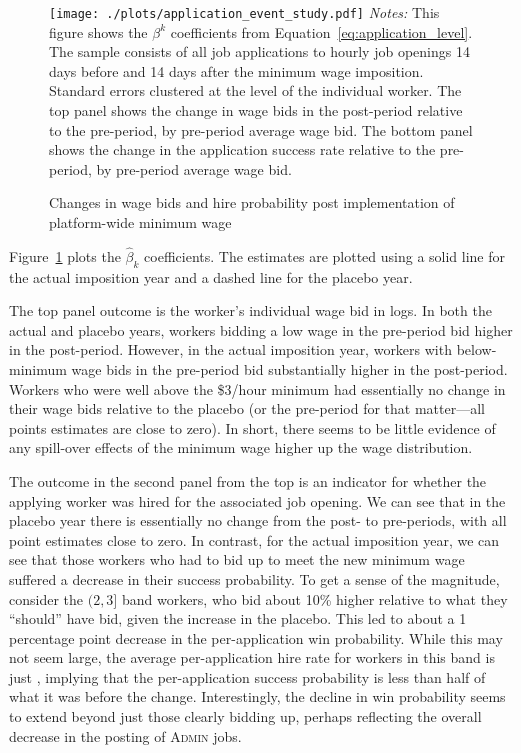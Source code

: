 \documentclass[AER]{AEA}
\newcommand{\admin}{\textsc{Admin}}
\begin{document}
\begin{figure}[ht!]
\centering 
\caption{Changes in wage bids and hire probability post implementation of platform-wide minimum wage} \label{fig:event_study} 
\begin{minipage}{0.95 \textwidth}
  \texttt{[image: ./plots/application\_event\_study.pdf]}
{\footnotesize
  \emph{Notes:} This figure shows the $\beta^k$ coefficients from Equation~\ref{eq:application_level}. 
   The sample consists of all job applications to hourly job openings 14 days before and 14 days after the minimum wage imposition.
   Standard errors clustered at the level of the individual worker. 
   The top panel shows the change in wage bids in the post-period relative to the pre-period, by pre-period average wage bid. 
   The bottom panel shows the change in the application success rate relative to the pre-period, by pre-period average wage bid.  
}
\end{minipage} 
\end{figure}

Figure~\ref{fig:event_study} plots the $\hat{\beta}_k$ coefficients.
The estimates are plotted using a solid line for the actual imposition year and a dashed line for the placebo year.

The top panel outcome is the worker's individual wage bid in logs.
In both the actual and placebo years, workers bidding a low wage in the pre-period bid higher in the post-period.
However, in the actual imposition year, workers with below-minimum wage bids in the pre-period bid substantially higher in the post-period.
Workers who were well above the \$3/hour minimum had essentially no change in their wage bids relative to the placebo (or the pre-period for that matter---all points estimates are close to zero).
In short, there seems to be little evidence of any spill-over effects of the minimum wage higher up the wage distribution. 

The outcome in the second panel from the top is an indicator for whether the applying worker was hired for the associated job opening. 
We can see that in the placebo year there is essentially no change from the post- to pre-periods, with all point estimates close to zero. 
In contrast, for the actual imposition year, we can see that those workers who had to bid up to meet the new minimum wage suffered a decrease in their success probability.   
To get a sense of the magnitude, consider the $(2,3]$ band workers, who bid about 10\% higher relative to what they ``should'' have bid, given the increase in the placebo.
This led to about a 1 percentage point decrease in the per-application win probability. 
While this may not seem large, the average per-application hire rate for workers in this band is just \TwoThreePerAppWinRate{}, implying that the per-application success probability is less than half of what it was before the change.  
Interestingly, the decline in win probability seems to extend beyond just those clearly bidding up, perhaps reflecting the overall decrease in the posting of \admin{} jobs. 
\end{document}
